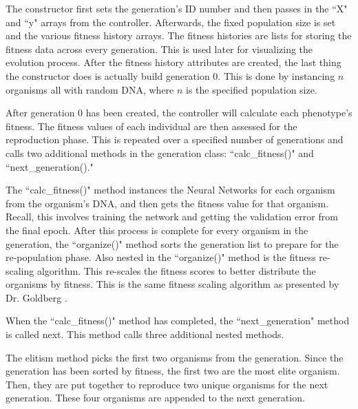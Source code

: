 \documentclass[12pt]{report}
\begin{document}


The constructor first sets the generation's ID number and then passes in the ``X" and ``y" arrays from the controller.
Afterwards, the fixed population size is set and the various fitness history arrays.
The fitness histories are lists for storing the fitness data across every generation.
This is used later for visualizing the evolution process.
After the fitness history attributes are created, the last thing the constructor does is actually build generation 0.
This is done by instancing $n$ organisms all with random DNA, where $n$ is the specified population size.

After generation 0 has been created, the controller will calculate each phenotype's fitness. The fitness values of each individual are then assessed for the reproduction phase.
This is repeated over a specified number of generations and calls two additional methods in the generation class: ``calc\_fitness()" and ``next\_generation()."



The ``calc\_fitness()" method instances the Neural Networks for each organism from the organism's DNA, and then gets the fitness value for that organism.
Recall, this involves training the network and getting the validation error from the final epoch.
After this process is complete for every organism in the generation, the ``organize()" method sorts the generation list to prepare for the re-population phase.
Also nested in the ``organize()" method is the fitness re-scaling algorithm.
This re-scales the fitness scores to better distribute the organisms by fitness.
This is the same fitness scaling algorithm as presented by Dr. Goldberg \cite{Goldberg:1989:GAS:534133}.

When the ``calc\_fitness()" method has completed, the ``next\_generation" method is called next. This method calls three additional nested methods.



The elitism method picks the first two organisms from the generation.
Since the generation has been sorted by fitness, the first two are the most elite organism.
Then, they are put together to reproduce two unique organisms for the next generation. These four organisms are appended to the next generation.
\end{document}
